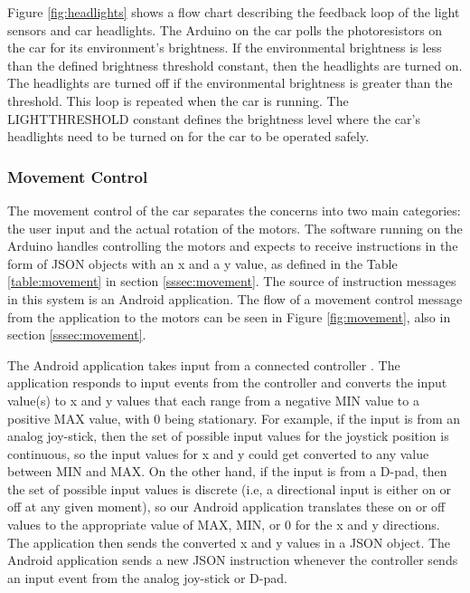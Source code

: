 \documentclass[letterpaper,12pt]{report}
\begin{document}
    Figure \ref{fig:headlights} shows a flow chart describing the feedback loop
    of the light sensors and car headlights. The Arduino on the car polls the
    photoresistors on the car for its environment's brightness. If the
    environmental brightness is less than the defined brightness threshold
    constant, then the headlights are turned on. The headlights are turned off
    if the environmental brightness is greater than the threshold. This loop is
    repeated when the car is running. The LIGHTTHRESHOLD constant defines the
    brightness level where the car's headlights need to be turned on for the car
    to be operated safely.

    \subsubsection{Movement Control}

    The movement control of the car separates the concerns into two main
    categories: the user input and the actual rotation of the motors. The
    software running on the Arduino handles controlling the motors and expects
    to receive instructions in the form of JSON objects with an x and a y value,
    as defined in the Table \ref{table:movement} in section
    \ref{sssec:movement}. The source of instruction messages in this system is an
    Android application. The flow of a movement control message from the
    application to the motors can be seen in Figure \ref{fig:movement}, also in
    section \ref{sssec:movement}.

    The Android application takes input from a connected controller
    \cite{controller}. The application responds to input events from the
    controller and converts the input value(s) to x and y values that each
    range from a negative MIN value to a positive MAX value, with 0 being
    stationary. For example, if the input is from an analog joy-stick, then
    the set of possible input values for the joystick position is continuous,
    so the input values for x and y could get converted to any value between
    MIN and MAX. On the other hand, if the input is from a D-pad, then the
    set of possible input values is discrete (i.e, a directional input is
    either on or off at any given moment), so our Android application
    translates these on or off values to the appropriate value of MAX, MIN,
    or 0 for the x and y directions. The application then sends the converted
    x and y values in a JSON object. The Android application sends a new JSON
    instruction whenever the controller sends an input event from the analog
    joy-stick or D-pad.
\end{document}
